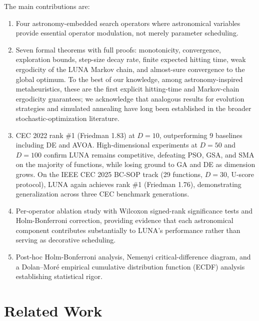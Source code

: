 \documentclass[review]{elsarticle}
\theoremstyle{definition}
\begin{document}
The main contributions are:
\begin{enumerate}[leftmargin=1.5em]
\item Four astronomy-embedded search operators where astronomical variables provide essential operator modulation, not merely parameter scheduling.
\item Seven formal theorems with full proofs: monotonicity, convergence, exploration bounds, step-size decay rate, finite expected hitting time, weak ergodicity of the LUNA Markov chain, and almost-sure convergence to the global optimum. To the best of our knowledge, among astronomy-inspired metaheuristics, these are the first explicit hitting-time and Markov-chain ergodicity guarantees; we acknowledge that analogous results for evolution strategies and simulated annealing have long been established in the broader stochastic-optimization literature.
\item CEC 2022 rank \#1 (Friedman 1.83) at $D=10$, outperforming 9 baselines including DE and AVOA. High-dimensional experiments at $D=50$ and $D=100$ confirm LUNA remains competitive, defeating PSO, GSA, and SMA on the majority of functions, while losing ground to GA and DE as dimension grows. On the IEEE CEC 2025 BC-SOP track (29 functions, $D=30$, U-score protocol), LUNA again achieves rank \#1 (Friedman 1.76), demonstrating generalization across three CEC benchmark generations.
\item Per-operator ablation study with Wilcoxon signed-rank significance tests and Holm-Bonferroni correction, providing evidence that each astronomical component contributes substantially to LUNA's performance rather than serving as decorative scheduling.
\item Post-hoc Holm-Bonferroni analysis, Nemenyi critical-difference diagram, and a Dolan--Mor\'e empirical cumulative distribution function (ECDF) analysis establishing statistical rigor.
\end{enumerate}

\section{Related Work}
\label{sec:related}
\end{document}
